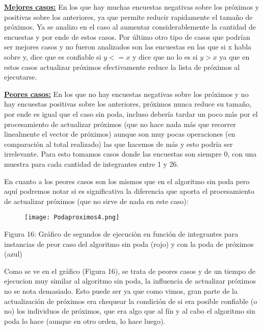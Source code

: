 \documentclass[A4paper,oneside,fleqn,10pt]{article}
\theoremstyle{definition}
\begin{document}
\underline{\textbf{Mejores casos:}} En los que hay muchas encuestas negativas sobre los próximos y positivas sobre los anteriores, ya que permite reducir rapidamente el tamaño de próximos. Ya se analizo en el caso al aumentar considerablemente la cantidad de encuestas y por ende de estos casos. Por último otro tipo de casos que podrían ser mejores casos y no fueron analizados son las encuestas en las que si x habla sobre y, dice que es confiable si $y<=x$ y dice que no lo es si $y>x$ ya que en estos casos actualizar próximos efectivamente reduce la lista de próximos al ejecutarse.





\underline{\textbf{Peores casos:}} En los que no hay encuestas negativas sobre los próximos y no hay encuestas positivas sobre los anteriores, próximos nunca reduce su tamaño, por ende es igual que el caso sin poda, incluso debería tardar un poco más por el procesamiento de actualizar próximos (que no hace nada más que recorrer linealmente el vector de próximos) aunque son muy pocas operaciones (en comparación al total realizado) las que hacemos de más y esto podría ser irrelevante. Para esto tomamos casos donde las encuestas son siempre 0, con una muestra para cada cantidad de integrantes entre 1 y 26.

En cuanto a los peores casos son los mismos que en el algoritmo sin poda pero aquí podremos notar si es significativa la diferencia que aporta el procesamiento de actualizar próximos (que no sirve de nada en  este caso):

\begin{figure}[!ht]
  \texttt{[image: Podaproximos4.png]}
    \label{fig:boat16}

\end{figure}

\scriptsize
      Figura 16: Gráfico de segundos de ejecución en función de integrantes para instancias de peor caso del algoritmo sin poda (rojo) y con la poda de próximos (azul)
   

\normalsize

Como se ve en el gráfico (Figura 16), se trata de peores casos y de un tiempo de ejecucion muy similar al algoritmo sin poda, la influencia de actualizar próximos no se nota demasiado. Esto puede ser ya que como vimos, gran parte de la actualización de próximos era chequear la condición de si era posible confiable (o no) los individuos de próximos, que era algo que al fín y al cabo el algoritmo sin poda lo hace (aunque en otro orden, lo hace luego).
\end{document}
